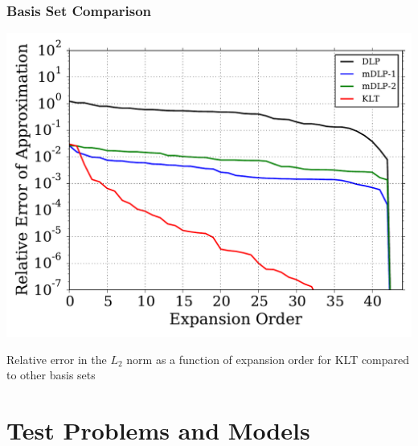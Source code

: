\documentclass[fleqn]{beamer}
\begin{document}
  \begin{frame}
      \frametitle{Basis Set Comparison}
      \centering
      \includegraphics[trim=.1cm .25cm .1cm .4cm, clip=true,
      totalheight=0.65\textheight]{Figures/KLT_example}
      \begin{block}{}
          Relative error in the $L_2$ norm as a function of expansion order for 
          KLT compared to other basis sets
      \end{block}

  \end{frame}

  
  \section{Test Problems and Models}
  
\end{document}
